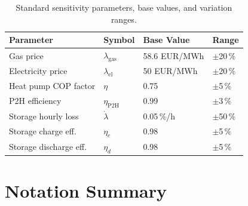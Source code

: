 \documentclass[a4paper,12pt]{article}
\begin{document}
\begin{table}[h!]
  \centering
  \caption{Standard sensitivity parameters, base values, and variation ranges.}
  \begin{tabular}{@{}llll@{}}
    \toprule
    Parameter & Symbol & Base Value & Range \\
    \midrule
    Gas price               & $\lambda_{\text{gas}}$       & 58.6 EUR/MWh & $\pm$20\,\% \\
    Electricity price       & $\lambda_{\text{el}}$        & 50 EUR/MWh   & $\pm$20\,\% \\
    Heat pump COP factor    & $\eta$                       & 0.75         & $\pm$5\,\%  \\
    P2H efficiency          & $\eta_{\text{P2H}}$          & 0.99         & $\pm$3\,\%  \\
    Storage hourly loss     & $\dot{\lambda}$              & 0.05\,\%/h   & $\pm$50\,\% \\
    Storage charge eff.     & $\eta_c$                     & 0.98         & $\pm$5\,\%  \\
    Storage discharge eff.  & $\eta_d$                     & 0.98         & $\pm$5\,\%  \\
    \bottomrule
  \end{tabular}
  \label{tab:sensitivity}
\end{table}

\section{Notation Summary}
\label{sec:notation}
\end{document}

